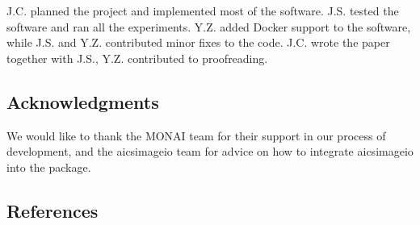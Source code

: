 J.C. planned the project and implemented most of the software. J.S. tested the software and ran all the experiments. Y.Z. added Docker support to the software, while J.S. and Y.Z. contributed minor fixes to the code. J.C. wrote the paper together with J.S., Y.Z. contributed to proofreading.

\hypertarget{acknowledgments}{%
\subsection{Acknowledgments}\label{acknowledgments}}

We would like to thank the MONAI team for their support in our process of development, and the aicsimageio team for advice on how to integrate aicsimageio into the package.

\hypertarget{references}{%
\subsection{References}\label{references}}

